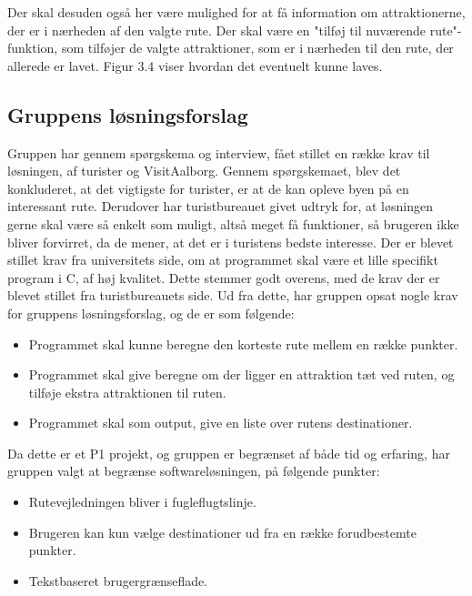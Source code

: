 Der skal desuden også her være mulighed for at få information om attraktionerne, der er i nærheden af den valgte rute. Der skal være en "tilføj til nuværende rute"-funktion, som tilføjer de valgte attraktioner, som er i nærheden til den rute, der allerede er lavet. Figur 3.4 viser hvordan det eventuelt kunne laves. \newline
\newline
\newline
\newline
\newline
\newline
\newline
\newline
\newline
 

\subsection{Gruppens løsningsforslag}
Gruppen har gennem spørgskema og interview, fået stillet en række krav til løsningen, af turister og VisitAalborg. 
Gennem spørgskemaet, blev det konkluderet, at det vigtigste for turister, er at de kan opleve byen på en interessant rute. 
Derudover har turistbureauet givet udtryk for, at løsningen gerne skal være så enkelt som muligt, altså meget få funktioner, så brugeren ikke bliver forvirret, da de mener, at det er i turistens bedste interesse. \newline
Der er blevet stillet krav fra universitets side, om at programmet skal være et lille specifikt program i C, af høj kvalitet. Dette stemmer godt overens, med de krav der er blevet stillet fra turistbureauets side.   \newline
Ud fra dette, har gruppen opsat nogle krav for gruppens løsningsforslag, og de er som følgende:
\begin{itemize}
	\item Programmet skal kunne beregne den korteste rute mellem en række punkter.
	\item Programmet skal give beregne om der ligger en attraktion tæt ved ruten, og tilføje ekstra attraktionen til ruten.
 	\item Programmet skal som output, give en liste over rutens destinationer.
\end{itemize}

Da dette er et P1 projekt, og gruppen er begrænset af både tid og erfaring, har gruppen valgt at begrænse softwareløsningen, på følgende punkter: 
\begin{itemize}
	\item Rutevejledningen bliver i fugleflugtslinje.
	\item Brugeren kan kun vælge destinationer ud fra en række forudbestemte punkter.
	\item Tekstbaseret brugergrænseflade.
\end{itemize}

